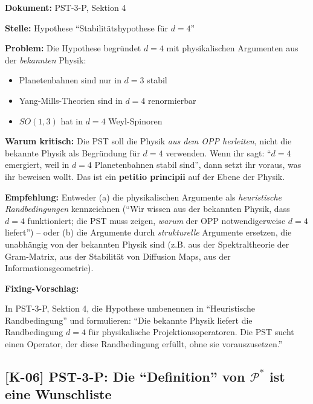 \documentclass[11pt,a4paper]{article}
\newcommand{\K}[1]{\textbf{[K-#1]}}
\newcommand{\Dok}[1]{\noindent\textbf{Dokument:} #1\par\smallskip}
\newcommand{\Stelle}[1]{\noindent\textbf{Stelle:} #1\par\smallskip}
\newcommand{\Prob}[1]{\noindent\textbf{Problem:} #1\par\smallskip}
\newcommand{\Krit}[1]{\noindent\textbf{Warum kritisch:} #1\par\smallskip}
\newcommand{\Empf}[1]{\noindent\textbf{Empfehlung:} #1\par\smallskip}
\newenvironment{Fix}
  {\par\medskip\noindent\textbf{Fixing-Vorschlag:}\par\nobreak\smallskip}
  {\par\medskip}
\begin{document}
\Dok{PST-3-P, Sektion 4}
\Stelle{Hypothese ``Stabilitätshypothese für $d = 4$''}
\Prob{Die Hypothese begründet $d = 4$ mit physikalischen Argumenten
aus der \emph{bekannten} Physik:
\begin{itemize}
  \item Planetenbahnen sind nur in $d = 3$ stabil
  \item Yang-Mills-Theorien sind in $d = 4$ renormierbar
  \item $SO(1,3)$ hat in $d = 4$ Weyl-Spinoren
\end{itemize}}
\Krit{Die PST soll die Physik \emph{aus dem OPP herleiten}, nicht die
bekannte Physik als Begründung für $d = 4$ verwenden. Wenn ihr
sagt: ``$d = 4$ emergiert, weil in $d = 4$ Planetenbahnen stabil
sind'', dann setzt ihr voraus, was ihr beweisen wollt. Das ist ein
\textbf{petitio principii} auf der Ebene der Physik.}
\Empf{Entweder (a) die physikalischen Argumente als \emph{heuristische
Randbedingungen} kennzeichnen (``Wir wissen aus der bekannten Physik,
dass $d = 4$ funktioniert; die PST muss zeigen, \emph{warum} der OPP
notwendigerweise $d = 4$ liefert'') -- oder (b) die Argumente durch
\emph{strukturelle} Argumente ersetzen, die unabhängig von der
bekannten Physik sind (z.B. aus der Spektraltheorie der Gram-Matrix,
aus der Stabilität von Diffusion Maps, aus der
Informationsgeometrie).}
\begin{Fix}
In PST-3-P, Sektion 4, die Hypothese umbenennen in
``Heuristische Randbedingung'' und formulieren: ``Die bekannte Physik
liefert die Randbedingung $d = 4$ für physikalische
Projektionsoperatoren. Die PST sucht einen Operator, der diese
Randbedingung erfüllt, ohne sie vorauszusetzen.''
\end{Fix}

\subsection{\K{06} PST-3-P: Die ``Definition'' von $\mathcal{P}^*$ ist eine Wunschliste}
\end{document}
